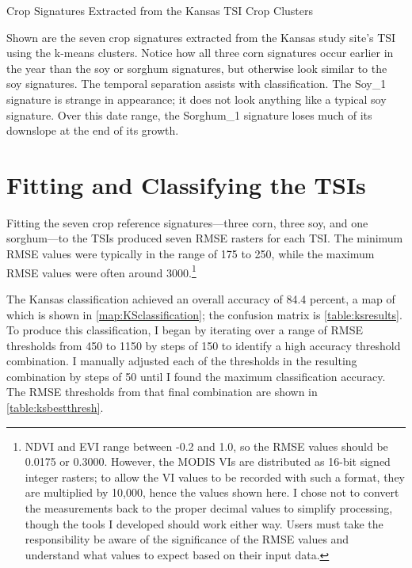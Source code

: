 \begin{ssfigure}
  \centering
  
  \caption{Crop Signatures Extracted from the Kansas TSI Crop Clusters}
  \medskip
  \small
  Shown are the seven crop signatures extracted from the Kansas study site's TSI using the k-means clusters. Notice how all three corn signatures occur earlier in the year than the soy or sorghum signatures, but otherwise look similar to the soy signatures. The temporal separation assists with classification. The Soy\_1 signature is strange in appearance; it does not look anything like a typical soy signature. Over this date range, the Sorghum\_1 signature loses much of its downslope at the end of its growth.
  \label{fig:KScropsigs}
\end{ssfigure}


\section{Fitting and Classifying the TSIs}
\label{results:classifications}

Fitting the seven crop reference signatures---three corn, three soy, and one sorghum---to the TSIs produced seven RMSE rasters for each TSI. The minimum RMSE values were typically in the range of 175 to 250, while the maximum RMSE values were often around 3000.\footnote{NDVI and EVI range between -0.2 and 1.0, so the RMSE values should be 0.0175 or 0.3000. However, the MODIS VIs are distributed as 16-bit signed integer rasters; to allow the VI values to be recorded with such a format, they are multiplied by 10,000, hence the values shown here. I chose not to convert the measurements back to the proper decimal values to simplify processing, though the tools I developed should work either way.  Users must take the responsibility be aware of the significance of the RMSE values and understand what values to expect based on their input data.} 

The Kansas classification achieved an overall accuracy of 84.4 percent, a map of which is shown in \autoref{map:KSclassification}; the confusion matrix is \autoref{table:ksresults}. To produce this classification, I began by iterating over a range of RMSE thresholds from 450 to 1150 by steps of 150 to identify a high accuracy threshold combination. I manually adjusted each of the thresholds in the resulting combination by steps of 50 until I found the maximum classification accuracy. The RMSE thresholds from that final combination are shown in \autoref{table:ksbestthresh}.

